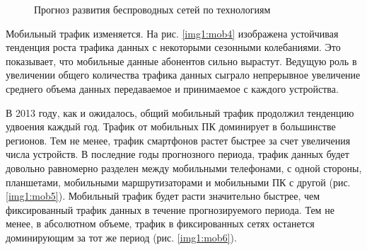 \pgfplotsset{width=15cm, height=10cm, compat=1.3}
\begin{figure} [!h]
  \center
{}
\caption{Прогноз развития беспроводных сетей по технологиям \cite{ericsson}}
  \label{img1:mob3}
\end{figure}


Мобильный трафик изменяется. На рис. \ref{img1:mob4} изображена устойчивая тенденция роста трафика данных с некоторыми сезонными колебаниями. Это показывает, что мобильные данные абонентов сильно вырастут. Ведущую роль в увеличении общего количества трафика данных сыграло непрерывное увеличение среднего объема данных передаваемое и принимаемое с каждого устройства.


В 2013 году, как и ожидалось, общий мобильный трафик продолжил тенденцию удвоения каждый год. Трафик от мобильных ПК доминирует в большинстве регионов. Тем не менее, трафик смартфонов растет быстрее за счет увеличения числа устройств. В последние годы прогнозного периода, трафик данных будет довольно равномерно разделен между мобильными телефонами, с одной стороны, планшетами, мобильными маршрутизаторами и мобильными ПК с другой (рис. \ref{img1:mob5}). Мобильный трафик будет расти значительно быстрее, чем фиксированный трафик данных в течение прогнозируемого периода. Тем не менее, в абсолютном объеме, трафик в фиксированных сетях останется доминирующим за тот же период (рис. \ref{img1:mob6}). 



